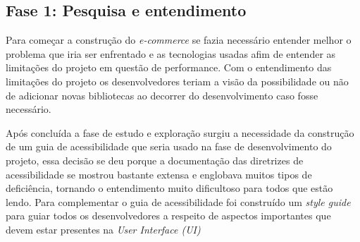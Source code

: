 \subsection{Fase 1: Pesquisa e entendimento}
{Para começar a construção do \textit{e-commerce} se fazia necessário entender melhor o problema que iria ser enfrentado e as tecnologias usadas afim de entender as limitações do projeto em questão de performance. Com o entendimento das limitações do projeto os desenvolvedores teriam a visão da possibilidade ou não de adicionar novas bibliotecas ao decorrer do desenvolvimento caso fosse necessário. 

Após concluída a fase de estudo e exploração surgiu a necessidade da construção de um guia de acessibilidade que seria usado na fase de desenvolvimento do projeto, essa decisão se deu porque a documentação das diretrizes de acessibilidade se mostrou bastante extensa e englobava muitos tipos de deficiência, tornando o entendimento muito dificultoso para todos que estão lendo. Para complementar o guia de acessibilidade foi construído um \cite{STYLE}{\textit{style guide}} para guiar todos os desenvolvedores a respeito de aspectos importantes que devem estar presentes na \textit{User Interface (UI)}}


